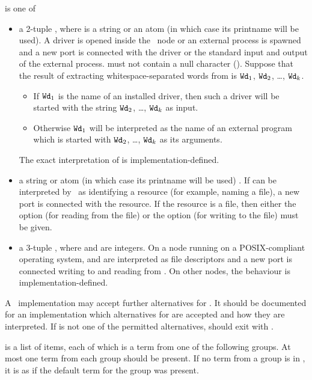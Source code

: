  is one of
\begin{itemize}
\item a 2-tuple , where  is a string
or an atom (in which case its printname will be used).  A driver is opened
inside the \Erlang\ node or an external
process is spawned and a new port is connected with the driver or the
standard input and output of the external process.
\ifOld
{} must not contain a null character ().
Suppose that the result of extracting whitespace-separated words from
 is ${\tt{\sl Wd}}_1$, ${\tt{\sl Wd}}_2$, \ldots, ${\tt{\sl Wd}}_k$.
\begin{itemize}
\item If ${\tt{\sl Wd}}_1$ is the name of an installed driver, then such a driver
will be started with the string ${\tt{\sl Wd}}_2$, \ldots, ${\tt{\sl Wd}}_k$ as
input.
\item Otherwise ${\tt{\sl Wd}}_1$ will be interpreted as the name of an
external program which is started with ${\tt{\sl Wd}}_2$, \ldots, ${\tt{\sl Wd}}_k$ as its arguments.
\end{itemize}
\fi
\ifStd
The exact interpretation of  is implementation-defined.
\fi
\ifOld
\item a string or atom (in which case its printname will be used) .
If  can be interpreted
by \OldErlang\ as identifying a resource (for example, naming a file),
a new port is connected with the resource.  If the resource is a file, then
either the option  (for reading from the file) or the option 
(for writing to the file) must be given.
\fi
\item a 3-tuple , where  and  are
integers.  On a node running on a POSIX-compliant operating system, 
and  are interpreted as file descriptors and a new port is connected
writing to  and reading from .  On other nodes, the behaviour
is implementation-defined.
\end{itemize}
\ifStd
A \StdErlang\ implementation may accept further alternatives for
.  It should be documented for an implementation which
alternatives for  are accepted and how they are
interpreted.
\fi
If  is not one of the permitted alternatives, 
should exit with .

 is a list of items, each of which is a term from one of the
following groups.  At most one term from each group should be present.
If no term from a group is in , it is as if the default
term for the group was present.

